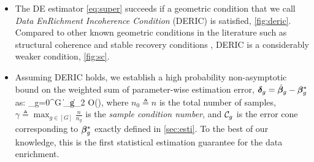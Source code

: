 \begin{itemize}[leftmargin = .4cm]
	\item The DE estimator \cref{eq:super} succeeds if a geometric condition that we call \emph{Data EnRichment Incoherence Condition} (DERIC) is satisfied, \cref{fig:deric}. Compared to other known geometric conditions in the literature such as structural coherence \cite{guba16} and stable recovery conditions \cite{mctr13}, DERIC is a considerably weaker condition, \cref{fig:sc}.
	\item Assuming DERIC holds, we establish a high probability non-asymptotic bound on the weighted sum of parameter-wise estimation error, $\boldsymbol{\delta}_g = \hat{\boldsymbol{\beta}}_g - \boldsymbol{\beta}_g^*$ as:
	\beq
	\label{eq:errorsum}
	\sum_{g=0}^{G}   \|\ddelta_g\|_2 \leq  \gamma O\left(\right),
	\eeq
	where $n_0 \triangleq n$ is the total number of samples, $\gamma \triangleq \max_{g \in [G] } \frac{n}{n_g}$ is the \emph{sample condition number}, and $\cC_g$ is the error cone corresponding to $\boldsymbol{\beta}_g^*$ exactly defined in \cref{sec:esti}.
	To the best of our knowledge, this is the first statistical estimation guarantee for the data enrichment.%
	

\end{itemize}

